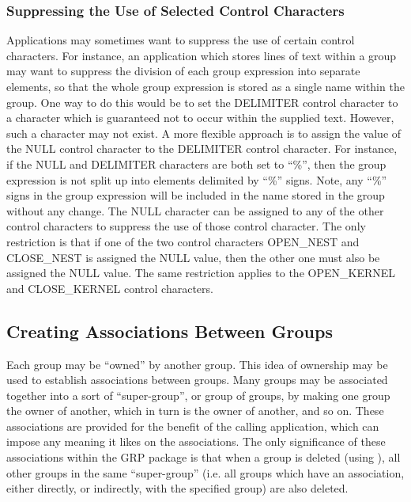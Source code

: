 \subsubsection {Suppressing the Use of Selected Control Characters}
Applications may sometimes want to suppress the use of certain control
characters. For instance, an application which stores lines of text within a
group may want to suppress the division of each group expression into separate
elements, so that the whole group expression is stored as a single name within
the group. One way to do this would be to set the DELIMITER control character to
a character which is guaranteed not to occur within the supplied text. However,
such a character may not exist. A more flexible approach is to assign the value
of the NULL control character to the DELIMITER control character. For instance,
if the NULL and DELIMITER characters are both set to ``\%'', then the group
expression is not split up into elements delimited by ``\%'' signs. Note, any
``\%'' signs in the group expression will be included in the name stored in the
group without any change. The NULL character can be assigned to any of the other
control characters to suppress the use of those control character. The only
restriction is that if one of the two control characters OPEN\_NEST and
CLOSE\_NEST is assigned the NULL value, then the other one must also be assigned
the NULL value. The same restriction applies to the OPEN\_KERNEL and
CLOSE\_KERNEL control characters.

\subsection{\label{SEC:OWN}Creating Associations Between Groups}

Each group may be ``owned'' by another group. This idea of ownership may be
used to
establish associations between groups. Many groups may be associated together
into a sort of ``super-group'', or group of groups, by making one group the
owner of another, which in turn is the owner of another, and so on. These
associations are provided for the benefit of the calling application, which can
impose any meaning it likes on the associations. The only significance of these
associations within the GRP package is that when a group is deleted (using
), all other groups in the same ``super-group'' (i.e. all groups which
have an association, either directly, or indirectly, with the specified group)
are also deleted.

